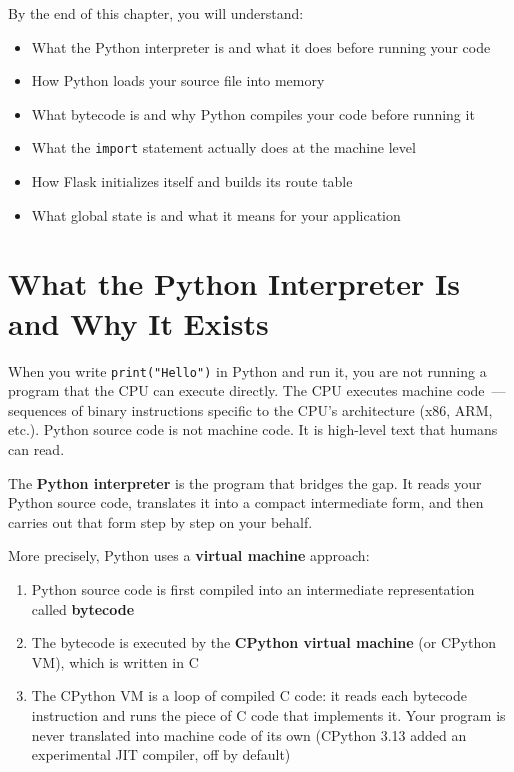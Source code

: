 \begin{objectives}

By the end of this chapter, you will understand:

\begin{itemize}
\tightlist
\item
  What the Python interpreter is and what it does before running your code
\item
  How Python loads your source file into memory
\item
  What bytecode is and why Python compiles your code before running it
\item
  What the \texttt{import} statement actually does at the machine level
\item
  How Flask initializes itself and builds its route table
\item
  What global state is and what it means for your application
\end{itemize}

\end{objectives}

\setcounter{section}{0}
\section{What the Python Interpreter Is and Why It Exists}\label{02-runtime-initialization:21-what-the-python-interpreter-is-and-why-it-exists}

When you write \texttt{print("Hello")} in Python and run it, you are not running a program that the CPU can execute directly. The CPU executes machine code~--- sequences of binary instructions specific to the CPU's architecture (x86, ARM, etc.). Python source code is not machine code. It is high-level text that humans can read.

The \textbf{Python interpreter} is the program that bridges the gap. It reads your Python source code, translates it into a compact intermediate form, and then carries out that form step by step on your behalf.

More precisely, Python uses a \textbf{virtual machine} approach:

\begin{enumerate}
\def\labelenumi{\arabic{enumi}.}
\tightlist
\item
  Python source code is first compiled into an intermediate representation called \textbf{bytecode}
\item
  The bytecode is executed by the \textbf{CPython virtual machine} (or CPython VM), which is written in C
\item
  The CPython VM is a loop of compiled C code: it reads each bytecode instruction and runs the piece of C code that implements it. Your program is never translated into machine code of its own (CPython 3.13 added an experimental JIT compiler, off by default)
\end{enumerate}

